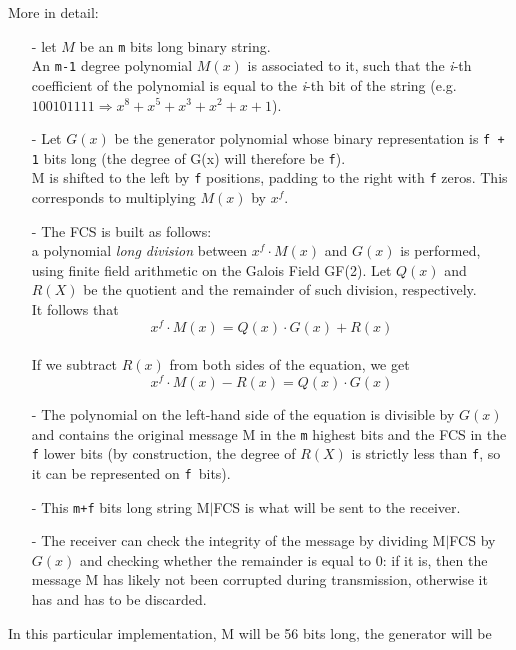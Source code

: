 \noindent More in detail:
\begin{itemize}[leftmargin=0pt, topsep=0pt,itemsep=-1ex,partopsep=1ex,parsep=1ex]
	\item[-] let $M$ be an \texttt{m} bits long binary string.\\
	An \texttt{m-1} degree polynomial $M(x)$ is associated to it, such that the \textit{i}-th coefficient of the polynomial is equal to the \textit{i}-th bit of the string (e.g. $100101111 \Rightarrow x^{8} + x^{5} + x^{3} + x^{2} + x + 1$).\\
	\item[-] Let $G(x)$ be the generator polynomial whose binary representation is \texttt{f + 1} bits long (the degree of G(x) will therefore be \texttt{f}).\\
M is shifted to the left by \texttt{f} positions, padding to the right with \texttt{f} zeros. This corresponds to multiplying $M(x)$ by $x^f$.\\
	\item[-] The FCS is built as follows:\\
	a polynomial \textit{long division} between $x^{f}{\cdot}M(x)$ and $G(x)$ is performed, using finite field arithmetic on the Galois Field GF(2). Let $Q(x)$ and $R(X)$ be the quotient and the remainder of such division, respectively. \\
	It follows that 
	\begin{equation}
		x^{f}{\cdot}M(x) = Q(x)\cdot G(x) + R(x)
		\label{eq:polynomial1}
	\end{equation}
\\
	If we subtract $R(x)$ from both sides of the equation, we get
	\begin{equation}
			x^{f}{\cdot}M(x) - R(x) = Q(x)\cdot G(x)
			\label{eq:polynomial2}
	\end{equation}
	\item[-] The polynomial on the left-hand side of the equation is divisible by $G(x)$ and contains the original message M in the \texttt{m} highest bits and the FCS in the \texttt{f} lower bits (by construction, the degree of $R(X)$ is strictly less than \texttt{f}, so it can be represented on \texttt{f }bits).\\
	\item[-] This \texttt{m+f} bits long string M{$|$}FCS is what will be sent to the receiver.\\
	\item[-] The receiver can check the integrity of the message by dividing M{$|$}FCS by $G(x)$ and checking whether the remainder is equal to 0: if it is, then the message M has likely not been corrupted during transmission, otherwise it has and has to be discarded.
\end{itemize}
\hfill \break
In this particular implementation, M will be 56 bits long, the generator will be

